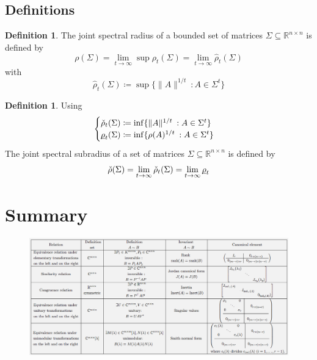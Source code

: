 \documentclass[12pt, openany]{report}
\theoremstyle{definition}
\newtheorem{definition}[thm]{Definition}
\newcommand{\R}{\mathbb{R}}
\begin{document}
\section{Definitions}
\begin{definition}
    The joint spectral radius of a bounded set of matrices $\Sigma \subseteq \R^{n\times n}$ is defined by 
    \begin{equation}
        \rho(\Sigma) = \lim_{t\rightarrow \infty} \sup \rho_t(\Sigma) = \lim_{t\rightarrow \infty} \hat \rho_t(\Sigma)
    \end{equation}
    with 
    \begin{equation}
        \hat \rho_t(\Sigma)\coloneqq \sup \{\lVert A\rVert^{1/t} \: : A\in \Sigma^t\}
    \end{equation}
\end{definition}
\begin{definition}
    Using 
    \begin{equation}
        \begin{cases}
            \check \rho_t(\Sigma) \coloneqq \inf \{\lVert A\rVert^{1/t} \: : A\in \Sigma^t\}\\
            \underbar{$\rho$}_t(\Sigma) \coloneqq \inf \{\rho(A)^{1/t}\: : A\in \Sigma^t\}\\
        \end{cases}
    \end{equation}
    The joint spectral subradius of a set of matrices $\Sigma \subseteq \R^{n\times n}$ is defined by
    \begin{equation}
        \check \rho(\Sigma) = \lim_{t\rightarrow \infty} \check \rho_t(\Sigma) = \lim_{t\rightarrow \infty} \underbar{$\rho$}_t
    \end{equation}
\end{definition}
\chapter{Summary}
\begin{figure}[H]
    \centering
    \includegraphics[width=\textwidth]{img/summary.png}
\end{figure}
\end{document}

